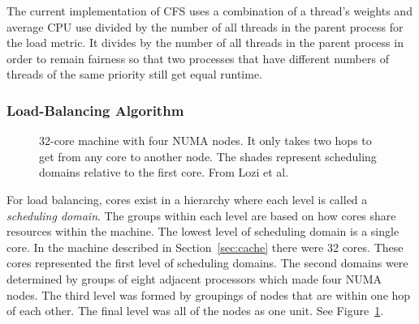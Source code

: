 \documentclass{sig-alternate}
\begin{document}
The current implementation of CFS uses a combination of a thread's weights and average CPU use divided by the number of all threads in the parent process for the load metric. It divides by the number of all threads in the parent process in order to remain fairness so that two processes that have different numbers of threads of the same priority still get equal runtime.~\cite{Lozi:2016}

\subsubsection{Load-Balancing Algorithm}
\label{sec:loadbalancealg}

\begin{figure}
\centering
{}
\caption{32-core machine with four NUMA nodes. It only takes two hops to get from any core to another node. The shades represent scheduling domains relative to the first core. From Lozi et al.~\cite{Lozi:2016}}
\label{fig:domains}
\end{figure}


For load balancing, cores exist in a hierarchy where each level is called a \emph{scheduling domain}. The groups within each level are based on how cores share resources within the machine. The lowest level of scheduling domain is a single core. In the machine described in Section~\ref{sec:cache} there were 32 cores. These cores represented the first level of scheduling domains. The second domains were determined by groups of eight adjacent processors which made four NUMA nodes. The third level was formed by groupings of nodes that are within one hop of each other. The final level was all of the nodes as one unit. See Figure~\ref{fig:domains}.~\cite{Lozi:2016}
\end{document}
